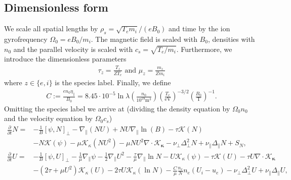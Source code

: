 \documentclass{hitec} %
\renewcommand{\vec}[1]{\boldsymbol{#1}}
\begin{document}
\subsection{Dimensionless form}
We scale all spatial lengths by $\rho_s = \sqrt{T_e m_i}/(eB_0)$ and time by the ion gyrofrequency $\Omega_0 = eB_0/m_i$.
The magnetic field is scaled with $B_0$, densities with $n_0$ and the parallel velocity is scaled with $c_s = \sqrt{T_e/m_i}$.
Furthermore, we introduce the dimensionless parameters
\begin{align}
  \tau_z = \frac{T_z}{ZT_e} \text{ and } \mu_z = \frac{m_z}{Zm_i}
  \label{}
\end{align}
where $z\in\{e,i\}$ is the species label. Finally, we define
\begin{align}
  C:=\frac{en_0\eta_\parallel}{B_0} = 8.45\cdot 10^{-5}\ln \lambda \left(\frac{n_0}{10^{19}\text{m}^3}\right) \left(\frac{T_e}{\text{eV}}\right)^{-3/2} \left(\frac{B_0}{\text{T}}\right)^{-1}.
    \label{}
\end{align}
Omitting the species label we arrive at (dividing the density equation by $\Omega_0n_0$ and the velocity equation by $\Omega_0 c_s$)
\begin{subequations}
    \begin{align}
    \frac{\partial}{\partial t} N =&
        - \frac{1}{B}[\psi, N]_{\perp}%
        - \nabla_\parallel \left( NU\right)
        + NU\nabla_\parallel\ln(B)
        - \tau \mathcal K(N) \nonumber \\&
        - N \mathcal K(\psi)
        -\mu \mathcal K_\kappa(NU^2)
        -\mu NU^2\nabla\cdot \vec{ \mathcal K_\kappa}
        - \nu_\perp\Delta_\perp^2 N + \nu_\parallel \Delta_\parallel N + S_N, \\
    \frac{\partial}{\partial t} U =&
        - \frac{1}{B}\left[\psi, U\right]_{\perp}%
        - \frac{1}{\mu} \nabla_\parallel \psi%
        - \frac{1}{2}\nabla_\parallel U^2
        -\frac{\tau}{\mu} \nabla_\parallel \ln N
        - U\mathcal K_\kappa(\psi)
        - \tau \mathcal K(U)
        -\tau U\nabla\cdot\vec{ \mathcal K_\kappa}\nonumber\\&
        - \left(2\tau + {\mu}U^2\right) \mathcal K_\kappa (U)
        -2\tau U\mathcal K_\kappa(\ln N)
        - \frac{C}{\mu} \frac{n_e}{N}n_e(U_i - u_e)
        - \nu_\perp\Delta_\perp^2 U + \nu_\parallel \Delta_\parallel U ,
        \label{eq:EgyrofluidU}
    \end{align}
    \label{eq:Egyrofluid}
\end{subequations}
\end{document}
